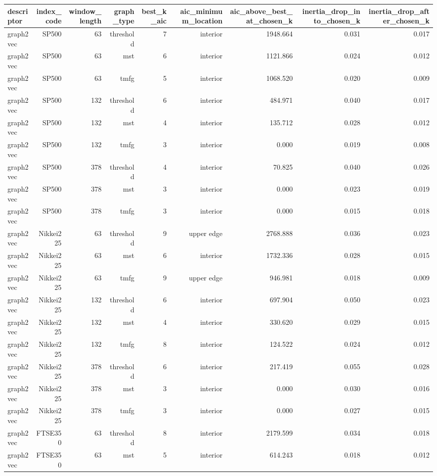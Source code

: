 \begin{tabular}{lrrrrrrrr}
\toprule
descriptor & index\_code & window\_length & graph\_type & best\_k\_aic & aic\_minimum\_location & aic\_above\_best\_at\_chosen\_k & inertia\_drop\_into\_chosen\_k & inertia\_drop\_after\_chosen\_k \\
\midrule
graph2vec & SP500 & 63 & threshold & 7 & interior & 1948.664 & 0.031 & 0.017 \\
graph2vec & SP500 & 63 & mst & 6 & interior & 1121.866 & 0.024 & 0.012 \\
graph2vec & SP500 & 63 & tmfg & 5 & interior & 1068.520 & 0.020 & 0.009 \\
graph2vec & SP500 & 132 & threshold & 6 & interior & 484.971 & 0.040 & 0.017 \\
graph2vec & SP500 & 132 & mst & 4 & interior & 135.712 & 0.028 & 0.012 \\
graph2vec & SP500 & 132 & tmfg & 3 & interior & 0.000 & 0.019 & 0.008 \\
graph2vec & SP500 & 378 & threshold & 4 & interior & 70.825 & 0.040 & 0.026 \\
graph2vec & SP500 & 378 & mst & 3 & interior & 0.000 & 0.023 & 0.019 \\
graph2vec & SP500 & 378 & tmfg & 3 & interior & 0.000 & 0.015 & 0.018 \\
graph2vec & Nikkei225 & 63 & threshold & 9 & upper edge & 2768.888 & 0.036 & 0.023 \\
graph2vec & Nikkei225 & 63 & mst & 6 & interior & 1732.336 & 0.028 & 0.015 \\
graph2vec & Nikkei225 & 63 & tmfg & 9 & upper edge & 946.981 & 0.018 & 0.009 \\
graph2vec & Nikkei225 & 132 & threshold & 6 & interior & 697.904 & 0.050 & 0.023 \\
graph2vec & Nikkei225 & 132 & mst & 4 & interior & 330.620 & 0.029 & 0.015 \\
graph2vec & Nikkei225 & 132 & tmfg & 8 & interior & 124.522 & 0.024 & 0.012 \\
graph2vec & Nikkei225 & 378 & threshold & 6 & interior & 217.419 & 0.055 & 0.028 \\
graph2vec & Nikkei225 & 378 & mst & 3 & interior & 0.000 & 0.030 & 0.016 \\
graph2vec & Nikkei225 & 378 & tmfg & 3 & interior & 0.000 & 0.027 & 0.015 \\
graph2vec & FTSE350 & 63 & threshold & 8 & interior & 2179.599 & 0.034 & 0.018 \\
graph2vec & FTSE350 & 63 & mst & 5 & interior & 614.243 & 0.018 & 0.012 \\

\end{tabular}
